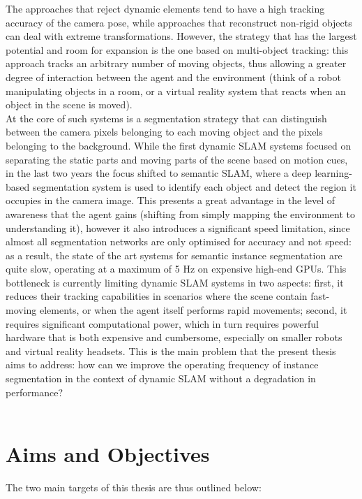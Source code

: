 \documentclass[12pt,twoside]{report}
\begin{document}
The approaches that reject dynamic elements tend to have a high tracking accuracy of the camera pose, while approaches that reconstruct non-rigid objects can deal with extreme transformations. However, the strategy that has the largest potential and room for expansion is the one based on multi-object tracking: this approach tracks an arbitrary number of moving objects, thus allowing a greater degree of interaction between the agent and the environment (think of a robot manipulating objects in a room, or a virtual reality system that reacts when an object in the scene is moved).
\\

At the core of such systems is a segmentation strategy that can distinguish between the camera pixels belonging to each moving object and the pixels belonging to the background. While the first dynamic SLAM systems focused on separating the static parts and moving parts of the scene based on motion cues, in the last two years the focus shifted to semantic SLAM, where a deep learning-based segmentation system is used to identify each object and detect the region it occupies in the camera image. This presents a great advantage in the level of awareness that the agent gains (shifting from simply mapping the environment to understanding it), however it also introduces a significant speed limitation, since almost all segmentation networks are only optimised for accuracy and not speed: as a result, the state of the art systems for semantic instance segmentation are quite slow, operating at a maximum of 5 Hz on expensive high-end GPUs.
This bottleneck is currently limiting dynamic SLAM systems in two aspects: first, it reduces their tracking capabilities in scenarios where the scene contain fast-moving elements, or when the agent itself performs rapid movements; second, it requires significant computational power, which in turn requires powerful hardware that is both expensive and cumbersome, especially on smaller robots and virtual reality headsets. This is the main problem that the present thesis aims to address: how can we improve the operating frequency of instance segmentation in the context of dynamic SLAM without a degradation in performance?
\\
\\

\section{Aims and Objectives}

The two main targets of this thesis are thus outlined below:
\end{document}
